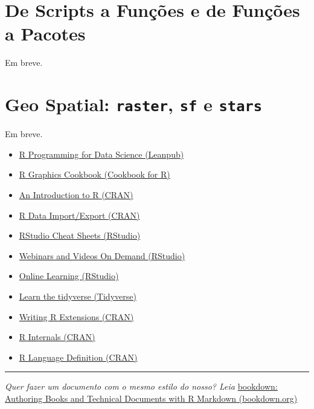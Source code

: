 \documentclass[]{book}
\providecommand{\tightlist}{%
  \setlength{\itemsep}{0pt}\setlength{\parskip}{0pt}}
\theoremstyle{definition}
\theoremstyle{definition}
\theoremstyle{definition}
\theoremstyle{remark}
\begin{document}
\chapter{De Scripts a Funções e de Funções a Pacotes}\label{fx}

Em breve.

\chapter{\texorpdfstring{Geo Spatial: \texttt{raster}, \texttt{sf} e
\texttt{stars}}{Geo Spatial: raster, sf e stars}}\label{geo}

Em breve.

\begin{itemize}
\tightlist
\item
  \href{https://leanpub.com/rprogramming}{R Programming for Data Science
  (Leanpub)}\\
\item
  \href{http://www.cookbook-r.com/Graphs/}{R Graphics Cookbook (Cookbook
  for R)}\\
\item
  \href{https://cran.r-project.org/doc/manuals/r-release/R-intro.html}{An
  Introduction to R (CRAN)}\\
\item
  \href{https://cran.r-project.org/doc/manuals/r-release/R-data.html}{R
  Data Import/Export (CRAN)}\\
\item
  \href{https://www.rstudio.com/resources/cheatsheets/}{RStudio Cheat
  Sheets (RStudio)}\\
\item
  \href{https://www.rstudio.com/resources/webinars/}{Webinars and Videos
  On Demand (RStudio)}\\
\item
  \href{https://www.rstudio.com/online-learning/}{Online Learning
  (RStudio)}\\
\item
  \href{https://www.tidyverse.org/learn/}{Learn the tidyverse
  (Tidyverse)}
\item
  \href{https://cran.r-project.org/doc/manuals/r-release/R-exts.html}{Writing
  R Extensions (CRAN)}\\
\item
  \href{https://cran.r-project.org/doc/manuals/r-release/R-ints.html}{R
  Internals (CRAN)}\\
\item
  \href{https://cran.r-project.org/doc/manuals/r-release/R-lang.html}{R
  Language Definition (CRAN)}
\end{itemize}

\begin{center}\rule{0.5\linewidth}{\linethickness}\end{center}

\emph{Quer fazer um documento com o mesmo estilo do nosso? Leia}
\href{https://bookdown.org/yihui/bookdown/}{bookdown: Authoring Books
and Technical Documents with R Markdown (bookdown.org)}


\end{document}
